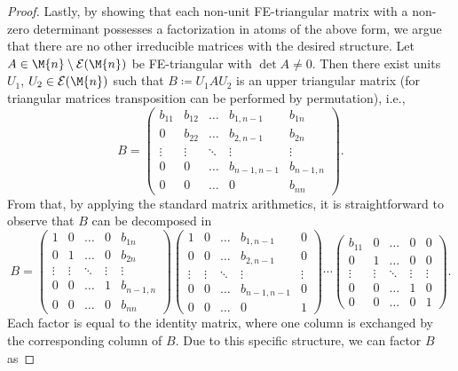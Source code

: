 \begin{proof}
Lastly, by showing that each non-unit FE-triangular matrix with a non-zero determinant possesses a factorization in atoms of the above form, we argue that there are no other irreducible matrices with the desired structure. Let $A \in \M{n}\setminus\mathcal{E}(\M{n})$ be FE-triangular with $\det{A} \neq 0$. Then there exist units $U_1$, $U_2 \in \mathcal{E}(\M{n})$ such that $B \coloneqq U_1AU_2$ is an upper triangular matrix (for triangular matrices transposition can be performed by permutation), i.e.,
\[ B = \begin{pmatrix} b_{11} & b_{12} & \ldots & b_{1,n-1} & b_{1n} \\ 0 & b_{22} & \ldots &  b_{2,n-1} & b_{2n} \\ \vdots & \vdots & \ddots & \vdots & \vdots \\ 0 & 0  & \ldots & b_{n-1,n-1} & b_{n-1,n} \\ 0 & 0 & \ldots & 0 &  b_{nn} \end{pmatrix}. \]
From that, by applying the standard matrix arithmetics, it is straightforward to observe that $B$ can be decomposed in 
\[ B = \begin{pmatrix} 1 & 0 & \ldots & 0 & b_{1n} \\ 0 & 1 & \ldots &  0 & b_{2n} \\ \vdots & \vdots & \ddots & \vdots & \vdots \\ 0 & 0  & \ldots & 1 & b_{n-1,n} \\ 0 & 0 & \ldots & 0 &  b_{nn} \end{pmatrix} 
\begin{pmatrix} 1 & 0 & \ldots & b_{1,n-1} & 0 \\ 0 & 0 & \ldots &  b_{2,n-1} & 0 \\ \vdots & \vdots & \ddots & \vdots & \vdots \\ 0 & 0  & \ldots & b_{n-1,n-1} & 0 \\ 0 & 0 & \ldots & 0 &  1 \end{pmatrix} \cdots
\begin{pmatrix} b_{11} & 0 & \ldots & 0 & 0 \\ 0 & 1 & \ldots &  0 & 0 \\ \vdots & \vdots & \ddots & \vdots & \vdots \\ 0 & 0  & \ldots & 1 & 0 \\ 0 & 0 & \ldots & 0 &  1 \end{pmatrix}. \]
Each factor is equal to the identity matrix, where one column is exchanged by the corresponding column of $B$. Due to this specific structure, we can factor $B$ as

\end{proof}

